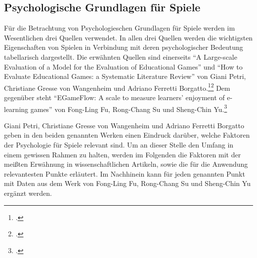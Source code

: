 \subsection{Psychologische Grundlagen für Spiele}
	Für die Betrachtung von Psychologieschen Grundlagen für Spiele werden im Wesentlichen drei Quellen verwendet. In allen drei Quellen werden die wichtigsten Eigenschaften von Spielen in Verbindung mit deren psychologischer Bedeutung tabellarisch dargestellt.
	Die erwähnten Quellen sind einerseits  \enquote{A Large-scale Evaluation of a Model for the Evaluation of Educational Games} und \enquote{How to Evaluate Educational Games: a Systematic Literature Review} von Giani Petri, Christiane Gresse von Wangenheim und Adriano Ferretti Borgatto.\footcite{psych1}\footcite{psych3} Dem gegenüber steht \enquote{EGameFlow: A scale to measure learners' enjoyment of e-learning games} von Fong-Ling Fu, Rong-Chang Su und Sheng-Chin Yu.\footcite{psych2}

	Giani Petri, Christiane Gresse von Wangenheim und Adriano Ferretti Borgatto geben in den beiden genannten Werken einen Eindruck darüber, welche Faktoren der Psychologie für Spiele relevant sind. Um an dieser Stelle den Umfang in einem gewissen Rahmen zu halten, werden im Folgenden die Faktoren mit der meißten Erwähnung in wissenschaftlichen Artikeln, sowie die für die Anwendung relevantesten Punkte erläutert. Im Nachhinein kann für jeden genannten Punkt mit Daten aus dem Werk von Fong-Ling Fu, Rong-Chang Su und Sheng-Chin Yu ergänzt werden.

